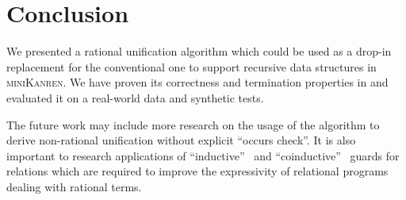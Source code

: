 \section{Conclusion}

We presented a rational unification algorithm which could be used as a drop-in replacement for the conventional one to support recursive data structures in \textsc{miniKanren}.
We have proven its correctness and termination properties in \Rocq and evaluated it on a real-world data and synthetic tests.

The future work may include more research on the usage of the algorithm to derive non-rational unification without explicit ``occurs check''. It is also important to research
applications of ``inductive''~\cite{bol1991analysis} and ``coinductive''~\cite{simon2006coinductive} guards for relations which are required to improve the expressivity of
relational programs dealing with rational terms.
